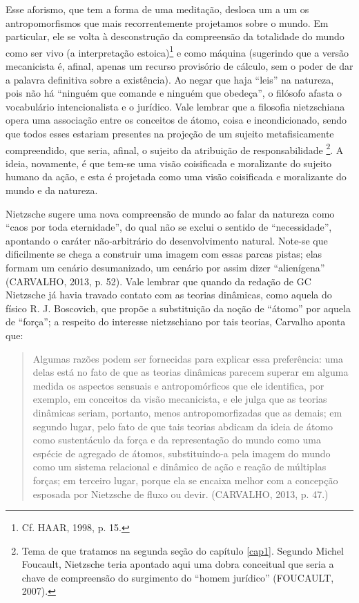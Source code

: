 \documentclass[
	12pt,				%
	openright,			%
	oneside,			%
	a4paper,			%
	english,			%
	french,				%
	spanish,			%
	brazil				%
	]{abntex2}
\begin{document}
Esse aforismo, que tem a forma de uma meditação, desloca um a um os antropomorfismos que mais recorrentemente projetamos sobre o mundo. Em particular, ele se volta à desconstrução da compreensão da totalidade do mundo como ser vivo (a interpretação estoica)\footnote{Cf. HAAR, 1998, p. 15.} e como máquina (sugerindo que a versão mecanicista é, afinal, apenas um recurso provisório de cálculo, sem o poder de dar a palavra definitiva sobre a existência). Ao negar que haja “leis” na natureza, pois não há “ninguém que comande e ninguém que obedeça”, o filósofo afasta o vocabulário intencionalista e o jurídico. Vale lembrar que a filosofia nietzschiana opera uma associação entre os conceitos de átomo, coisa e incondicionado, sendo que todos esses estariam presentes na projeção de um sujeito metafisicamente compreendido, que seria, afinal, o sujeito da atribuição de responsabilidade
\footnote{Tema de que tratamos na segunda seção do capítulo \ref{cap1}. Segundo Michel Foucault, Nietzsche teria apontado aqui uma dobra conceitual que seria a chave de compreensão do surgimento do “homem jurídico” (FOUCAULT, 2007).}. 
A ideia, novamente, é que tem-se uma visão coisificada e moralizante do sujeito humano da ação, e esta é projetada como uma visão coisificada e moralizante do mundo e da natureza.

Nietzsche sugere uma nova compreensão de mundo ao falar da natureza como “caos por toda eternidade”, do qual não se exclui o sentido de “necessidade”, apontando o caráter não-arbitrário do desenvolvimento natural. Note-se que dificilmente se chega a construir uma imagem com essas parcas pistas; elas formam um cenário desumanizado, um cenário por assim dizer “alienígena” (CARVALHO, 2013, p. 52). Vale lembrar que quando da redação de GC Nietzsche já havia travado contato com as teorias dinâmicas, como aquela do físico R. J. Boscovich, que propõe a substituição da noção de “átomo” por aquela de “força”; a respeito do interesse nietzschiano por tais teorias, Carvalho aponta que:

\begin{quotation}
Algumas razões podem ser fornecidas para explicar essa preferência: uma delas está no fato de que as teorias dinâmicas parecem superar em alguma medida os aspectos sensuais e antropomórficos que ele identifica, por exemplo, em conceitos da visão mecanicista, e ele julga que as teorias dinâmicas seriam, portanto, menos antropomorfizadas que as demais; em segundo lugar, pelo fato de que tais teorias abdicam da ideia de átomo como sustentáculo da força e da representação do mundo como uma espécie de agregado de átomos, substituindo-a pela imagem do mundo como um sistema relacional e dinâmico de ação e reação de múltiplas forças; em terceiro lugar, porque ela se encaixa melhor com a concepção esposada por Nietzsche de fluxo ou devir. (CARVALHO, 2013, p. 47.)
\end{quotation}
\end{document}
